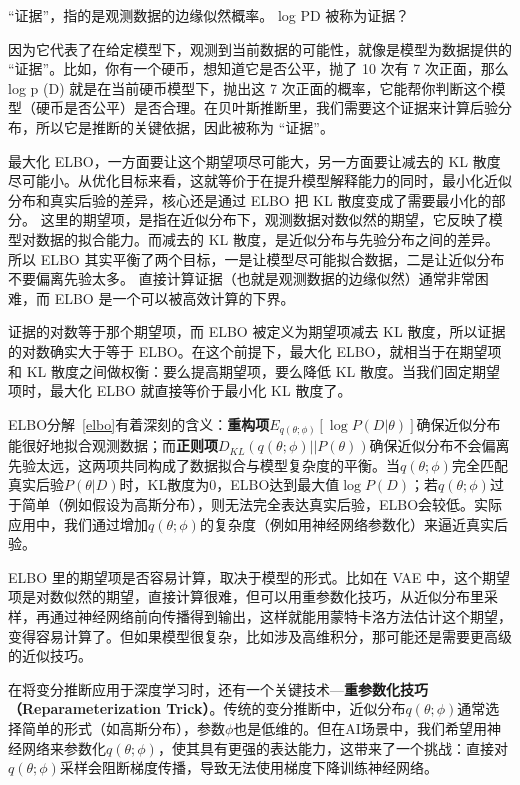 “证据”，指的是观测数据的边缘似然概率。
log PD 被称为证据？

因为它代表了在给定模型下，观测到当前数据的可能性，就像是模型为数据提供的 “证据”。比如，你有一个硬币，想知道它是否公平，抛了 10 次有 7 次正面，那么 log p (D) 就是在当前硬币模型下，抛出这 7 次正面的概率，它能帮你判断这个模型（硬币是否公平）是否合理。在贝叶斯推断里，我们需要这个证据来计算后验分布，所以它是推断的关键依据，因此被称为 “证据”。

最大化 ELBO，一方面要让这个期望项尽可能大，另一方面要让减去的 KL 散度尽可能小。从优化目标来看，这就等价于在提升模型解释能力的同时，最小化近似分布和真实后验的差异，核心还是通过 ELBO 把 KL 散度变成了需要最小化的部分。
这里的期望项，是指在近似分布下，观测数据对数似然的期望，它反映了模型对数据的拟合能力。而减去的 KL 散度，是近似分布与先验分布之间的差异。所以 ELBO 其实平衡了两个目标，一是让模型尽可能拟合数据，二是让近似分布不要偏离先验太多。
直接计算证据（也就是观测数据的边缘似然）通常非常困难，而 ELBO 是一个可以被高效计算的下界。

证据的对数等于那个期望项，而 ELBO 被定义为期望项减去 KL 散度，所以证据的对数确实大于等于 ELBO。在这个前提下，最大化 ELBO，就相当于在期望项和 KL 散度之间做权衡：要么提高期望项，要么降低 KL 散度。当我们固定期望项时，最大化 ELBO 就直接等价于最小化 KL 散度了。

ELBO分解~\eqref{elbo}有着深刻的含义：\textbf{重构项}$E_{q(\theta;\phi)}[\log P(D|\theta)]$确保近似分布能很好地拟合观测数据；而\textbf{正则项}$D_{KL}(q(\theta;\phi)||P(\theta))$确保近似分布不会偏离先验太远，这两项共同构成了数据拟合与模型复杂度的平衡。当$q(\theta;\phi)$完全匹配真实后验$P(\theta|D)$时，KL散度为0，ELBO达到最大值$\log P(D)$；若$q(\theta;\phi)$过于简单（例如假设为高斯分布），则无法完全表达真实后验，ELBO会较低。实际应用中，我们通过增加$q(\theta;\phi)$的复杂度（例如用神经网络参数化）来逼近真实后验。

ELBO 里的期望项是否容易计算，取决于模型的形式。比如在 VAE 中，这个期望项是对数似然的期望，直接计算很难，但可以用重参数化技巧，从近似分布里采样，再通过神经网络前向传播得到输出，这样就能用蒙特卡洛方法估计这个期望，变得容易计算了。但如果模型很复杂，比如涉及高维积分，那可能还是需要更高级的近似技巧。

在将变分推断应用于深度学习时，还有一个关键技术---\textbf{重参数化技巧（Reparameterization Trick）}。传统的变分推断中，近似分布$q(\theta;\phi)$通常选择简单的形式（如高斯分布），参数$\phi$也是低维的。但在AI场景中，我们希望用神经网络来参数化$q(\theta;\phi)$，使其具有更强的表达能力，这带来了一个挑战：直接对$q(\theta;\phi)$采样会阻断梯度传播，导致无法使用梯度下降训练神经网络。

